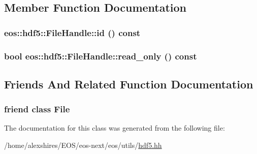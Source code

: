 \subsection{Member Function Documentation}
\hypertarget{classeos_1_1hdf5_1_1FileHandle_ad82bab7945b094e0504e1956026481ae}{
\subsubsection[{id}]{ eos::hdf5::FileHandle::id () const}}
\label{classeos_1_1hdf5_1_1FileHandle_ad82bab7945b094e0504e1956026481ae}
\hypertarget{classeos_1_1hdf5_1_1FileHandle_a48481c6740c14dc65b04561ad68edef6}{
\subsubsection[{read\_\-only}]{\setlength{\rightskip}{0pt plus 5cm}bool eos::hdf5::FileHandle::read\_\-only () const}}
\label{classeos_1_1hdf5_1_1FileHandle_a48481c6740c14dc65b04561ad68edef6}


\subsection{Friends And Related Function Documentation}
\hypertarget{classeos_1_1hdf5_1_1FileHandle_a68d15876ad188b7628261b12d0eac8aa}{
\subsubsection[{File}]{\setlength{\rightskip}{0pt plus 5cm}friend class {\bf File}}}
\label{classeos_1_1hdf5_1_1FileHandle_a68d15876ad188b7628261b12d0eac8aa}


The documentation for this class was generated from the following file:\begin{DoxyCompactItemize}
\item 
/home/alexshires/EOS/eos-\/next/eos/utils/\hyperlink{hdf5_8hh}{hdf5.hh}\end{DoxyCompactItemize}
